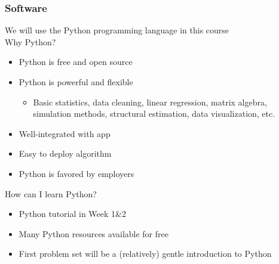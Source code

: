 \documentclass{beamer}
\begin{document}
\begin{frame}\frametitle{Software}
    We will use the Python programming language in this course \\
    \vspace{2ex}
    Why Python?
    \begin{itemize}
        \item Python is free and open source
        \item Python is powerful and flexible
        \begin{itemize}
            \item Basic statistics, data cleaning, linear regression, matrix algebra, simulation methods, structural estimation, data visualization, etc.
        \end{itemize}
        \item Well-integrated with app
        \item Easy to deploy algorithm
        \item Python is favored by employers
    \end{itemize}
    \vspace{2ex}
    How can I learn Python?
    \begin{itemize}
        \item Python tutorial in Week 1{\&}2
        \item Many Python resources available for free
        \item First problem set will be a (relatively) gentle introduction to Python
    \end{itemize}
\end{frame}
\end{document}
